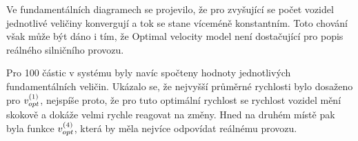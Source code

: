 \documentclass[a4paper, 12pt, fleqn]{article}
\begin{document}
Ve fundamentálních diagramech se projevilo, že pro zvyšující se počet vozidel jednotlivé veličiny konvergují a tok se stane víceméně konstantním. Toto chování však může být dáno i tím, že Optimal velocity model není dostačující pro popis reálného silničního provozu.

Pro 100 částic v systému byly navíc spočteny hodnoty jednotlivých fundamentálních veličin. Ukázalo se, že nejvyšší průměrné rychlosti bylo dosaženo pro $v_{opt}^{(1)}$, nejspíše proto, že pro tuto optimální rychlost se rychlost vozidel mění skokově a dokáže velmi rychle reagovat na změny. Hned na druhém místě pak byla funkce $v_{opt}^{(4)}$, která by měla nejvíce odpovídat reálnému provozu.
\end{document}

